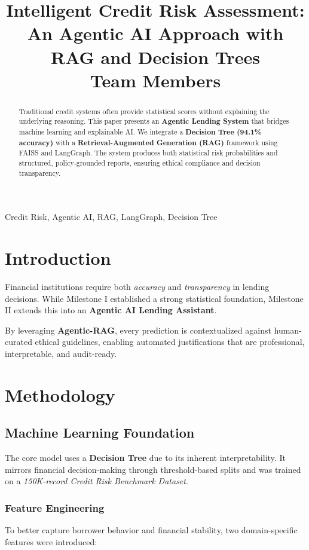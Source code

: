 \documentclass[conference]{IEEEtran}
\title{
\textbf{Intelligent Credit Risk Assessment:}\\[0.4em]
\large An Agentic AI Approach with RAG and Decision Trees \\
\vspace{0.4cm}
\large Team Members
}
\author{
\IEEEauthorblockN{
Shivansh Bhargava \and 
Devansh Saini \and 
Om Gupta \and 
Sahil Khemnar
}
}
\begin{document}
\maketitle

\begin{abstract}
Traditional credit systems often provide statistical scores without explaining the underlying reasoning. This paper presents an \textbf{Agentic Lending System} that bridges machine learning and explainable AI. We integrate a \textbf{Decision Tree (94.1\% accuracy)} with a \textbf{Retrieval-Augmented Generation (RAG)} framework using FAISS and LangGraph. The system produces both statistical risk probabilities and structured, policy-grounded reports, ensuring ethical compliance and decision transparency.
\end{abstract}

\begin{IEEEkeywords}
Credit Risk, Agentic AI, RAG, LangGraph, Decision Tree
\end{IEEEkeywords}

\vspace{0.2cm}

\section{Introduction}
Financial institutions require both \textit{accuracy} and \textit{transparency} in lending decisions. While Milestone I established a strong statistical foundation, Milestone II extends this into an \textbf{Agentic AI Lending Assistant}.

By leveraging \textbf{Agentic-RAG}, every prediction is contextualized against human-curated ethical guidelines, enabling automated justifications that are professional, interpretable, and audit-ready.

\section{Methodology}

\subsection{Machine Learning Foundation}
The core model uses a \textbf{Decision Tree} due to its inherent interpretability. It mirrors financial decision-making through threshold-based splits and was trained on a \textit{150K-record Credit Risk Benchmark Dataset}.

\subsubsection{Feature Engineering}
To better capture borrower behavior and financial stability, two domain-specific features were introduced:
\end{document}
